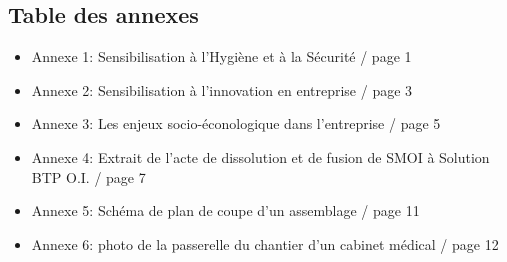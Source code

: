 \newpage
{}
\begin{center}
    \section{Table des annexes}
\end{center}

\begin{itemize}
    \item Annexe 1: Sensibilisation à l'Hygiène et à la Sécurité / page 1
    \item Annexe 2: Sensibilisation à l'innovation en entreprise / page 3
    \item Annexe 3: Les enjeux socio-éconologique dans l'entreprise / page 5
    \item Annexe 4: Extrait de l'acte de dissolution et de fusion de SMOI à Solution BTP O.I. / page 7
    \item Annexe 5: Schéma de plan de coupe d'un assemblage / page 11
    \item Annexe 6: photo de la passerelle du chantier d'un cabinet médical / page 12
\end{itemize}
